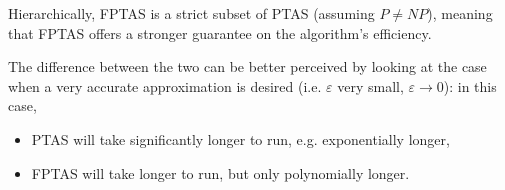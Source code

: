 Hierarchically, FPTAS is a strict subset of PTAS (assuming $P\neq NP$), meaning that FPTAS offers a stronger guarantee on the algorithm's efficiency.

The difference between the two can be better perceived by looking at the case when a very accurate approximation is desired (i.e. $\varepsilon$ very small, $\varepsilon\rightarrow 0$): in this case,
\begin{itemize}
  \item PTAS will take significantly longer to run, e.g. exponentially longer,
  \item FPTAS will take longer to run, but only polynomially longer.
\end{itemize}